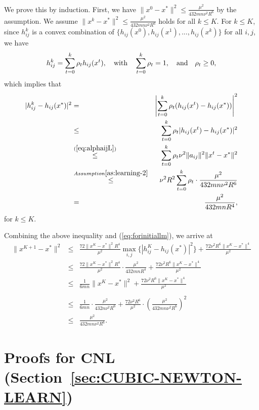 \documentclass[10pt]{article}
\newcommand{\newalpha}{h}
\begin{document}
We prove this by induction. First, we have $\|x^0 - x^*\|^2 \leq \frac{\mu^2}{432mn \nu^2R^6}$ by the assumption. We assume $\|x^k - x^*\|^2 \leq \frac{\mu^2}{432mn \nu^2R^6}$ holds for all $k \leq K$. For $k\leq K$, since $h_{ij}^k$ is a convex combination of $\{  \newalpha_{ij}(x^0), \newalpha_{ij}(x^1), ..., \newalpha_{ij}(x^k)  \}$ for all $i,j$, we have 
$$
h_{ij}^k = \sum_{t=0}^k \rho_t \newalpha_{ij}(x^t), \quad {\rm with}\quad  \sum_{t=0}^k\rho_t = 1, \quad {\rm and} \quad \rho_t \geq 0, 
$$
which implies that 
\begin{eqnarray*}
	|h_{ij}^k - \newalpha_{ij}(x^*)|^2 &=&   \left|  \sum_{t=0}^k \rho_t (\newalpha_{ij}(x^t) - \newalpha_{ij}(x^*))  \right|^2 \\ 
	&\leq&   \sum_{t=0}^k \rho_t | \newalpha_{ij}(x^t) - \newalpha_{ij}(x^*) |^2 \\ 
	&\overset{(\ref{eq:alphaijL})}{\leq}&   \sum_{t=0}^k \rho_t \nu^2 \|a_{ij}\|^2 \|x^t - x^*\|^2 \\ 
	&\overset{Assumption \ref{as:learning-2}}{\leq}& \nu^2 R^2  \sum_{t=0}^k \rho_t \cdot \frac{\mu^2}{432mn \nu^2R^6} \\
	&=& \frac{ \mu^2}{432mnR^4}, 
\end{eqnarray*}
for $k\leq K$. 

Combining the above inequality and (\ref{eq:forinitiallm}), we arrive at 
\begin{eqnarray*}
	\|x^{K+1} - x^*\|^2 &\leq& \frac{72\|x^K-x^*\|^2 R^4}{\mu^2} \max_{i, j} \{  | h_{ij}^K - \newalpha_{ij}(x^*) |^2  \}  + \frac{ 72\nu^2 R^6\|x^K-x^*\|^4}{\mu^2} \\
	&\leq& \frac{72\|x^K-x^*\|^2 R^4}{\mu^2} \cdot  \frac{ \mu^2}{432mnR^4} +  \frac{ 72\nu^2 R^6\|x^K-x^*\|^4}{\mu^2} \\
	&\leq& \frac{1}{6mn}\|x^K - x^*\|^2 + \frac{ 72\nu^2 R^6\|x^K-x^*\|^4}{\mu^2} \\ \\
	&\leq& \frac{1}{6mn} \cdot \frac{\mu^2}{432n \nu^2R^6} + \frac{72 \nu^2 R^6}{\mu^2} \cdot \left(\frac{\mu^2}{432mn \nu^2R^6} \right)^2 \\ 
	&\leq& \frac{\mu^2}{432mn \nu^2R^6}. 
\end{eqnarray*}

\clearpage








\section{Proofs for {\sf CNL} (Section~\ref{sec:CUBIC-NEWTON-LEARN})}
\end{document}

